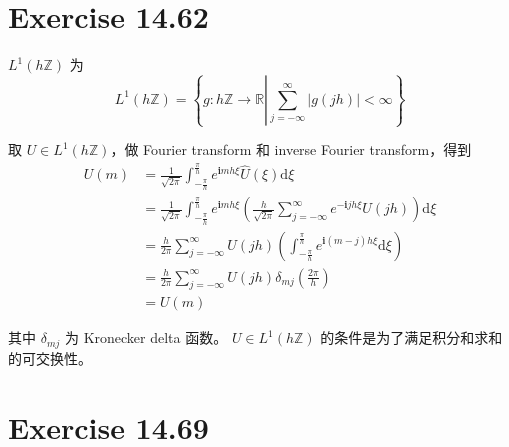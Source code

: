 \documentclass[a4paper]{article}
\begin{document}
\section*{Exercise 14.62}

\par $L^1(h\mathbb{Z})$ 为
\begin{equation}
    L^1(h\mathbb{Z}) = \left\{
        g: h\mathbb{Z} \to \mathbb{R}
        \left|
            \sum_{j=-\infty}^{\infty}|g(jh)| < \infty
        \right.
    \right\}
\end{equation}
\par 取 $U\in L^1(h\mathbb{Z})$，做 Fourier transform 和 inverse Fourier transform，得到
\begin{equation}
    \begin{aligned}
        U(m) 
        &= \frac{1}{\sqrt{2\pi}}
        \int_{-\frac{\pi}{h}}^{\frac{\pi}{h}}
        e^{\mathbf{i}mh\xi}\hat{U}(\xi)\text{d}\xi\\
        &= \frac{1}{\sqrt{2\pi}}
        \int_{-\frac{\pi}{h}}^{\frac{\pi}{h}}
        e^{\mathbf{i}mh\xi}
        \left(\frac{h}{\sqrt{2\pi}}
            \sum_{j=-\infty}^{\infty}e^{-\mathbf{i}jh\xi}U(jh)
        \right)\text{d}\xi\\
        &= \frac{h}{2\pi}\sum_{j=-\infty}^{\infty}U(jh)
        \left(
            \int_{-\frac{\pi}{h}}^{\frac{\pi}{h}}
            e^{\mathbf{i}(m-j)h\xi}\text{d}\xi
        \right)\\
        &= \frac{h}{2\pi}\sum_{j=-\infty}^{\infty}U(jh)\delta_{mj}\left(\frac{2\pi}{h}\right)\\
        &= U(m)
    \end{aligned}
\end{equation}
\par 其中 $\delta_{mj}$ 为 Kronecker delta 函数。
$U\in L^1(h\mathbb{Z})$ 的条件是为了满足积分和求和的可交换性。

\section*{Exercise 14.69}
\end{document}
